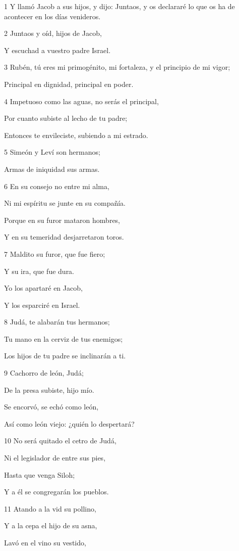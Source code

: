\par 1 Y llamó Jacob a sus hijos, y dijo: Juntaos, y os declararé lo que os ha de acontecer en los días venideros.
\par 2 Juntaos y oíd, hijos de Jacob,
\par Y escuchad a vuestro padre Israel.
\par 3 Rubén, tú eres mi primogénito, mi fortaleza, y el principio de mi vigor;
\par Principal en dignidad, principal en poder.
\par 4 Impetuoso como las aguas, no serás el principal,
\par Por cuanto subiste al lecho de tu padre;
\par Entonces te envileciste, subiendo a mi estrado.
\par 5 Simeón y Leví son hermanos;
\par Armas de iniquidad sus armas.
\par 6 En su consejo no entre mi alma,
\par Ni mi espíritu se junte en su compañía.
\par Porque en su furor mataron hombres,
\par Y en su temeridad desjarretaron toros.
\par 7 Maldito su furor, que fue fiero;
\par Y su ira, que fue dura.
\par Yo los apartaré en Jacob,
\par Y los esparciré en Israel.
\par 8 Judá, te alabarán tus hermanos;
\par Tu mano en la cerviz de tus enemigos;
\par Los hijos de tu padre se inclinarán a ti.
\par 9 Cachorro de león, Judá;
\par De la presa subiste, hijo mío.
\par Se encorvó, se echó como león,
\par Así como león viejo: ¿quién lo despertará?
\par 10 No será quitado el cetro de Judá,
\par Ni el legislador de entre sus pies,
\par Hasta que venga Siloh;
\par Y a él se congregarán los pueblos.
\par 11 Atando a la vid su pollino,
\par Y a la cepa el hijo de su asna,
\par Lavó en el vino su vestido,
